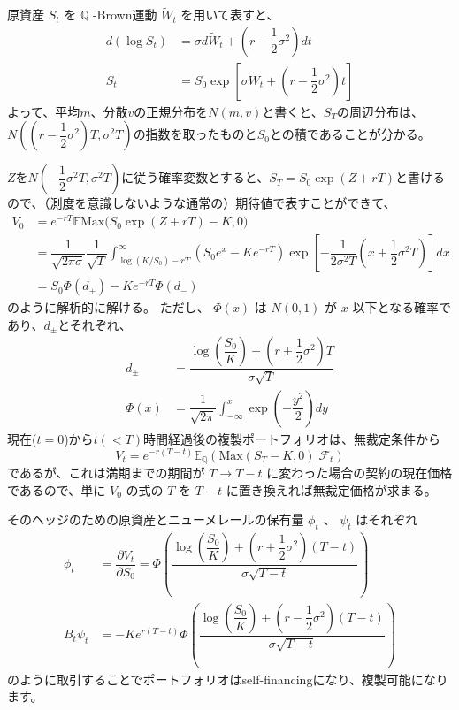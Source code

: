 \documentclass[uplatex,a4j,12pt,dvipdfmx]{jsarticle}
\begin{document}
原資産 $S_{t}$ を $\mathbb{Q}$ -Brown運動 $\tilde{W}_{t}$ を用いて表すと、
\begin{align*}
	d(\log S_{t}) & = \sigma d \tilde{W}_{t} + \left( r - \dfrac{1}{2} \sigma^{2} \right) dt                        \\
	S_{t}         & = S_{0} \exp \left[ \sigma \tilde{W}_{t} + \left( r - \dfrac{1}{2} \sigma^{2} \right) t \right]
\end{align*}
よって、平均$m$、分散$v$の正規分布を$N(m,v)$と書くと、$S_{T}$の周辺分布は、$N \left( \left( r - \dfrac{1}{2} \sigma^{2} \right) T , \sigma^{2} T \right)$の指数を取ったものと$S_{0}$との積であることが分かる。

$Z$を$N \left( - \dfrac{1}{2} \sigma^{2} T , \sigma^{2} T \right)$に従う確率変数とすると、$S_{T} = S_{0} \exp ( Z + rT )$と書けるので、（測度を意識しないような通常の）期待値で表すことができて、
\begin{align*}
	V_{0} & = e^{-rT} \mathbb{E} \mathrm{Max} \Big( S_{0} \exp ( Z + rT ) - K , 0 \Big)                                                                                                                                                    \\
	      & = \dfrac{1}{\sqrt{2 \pi \sigma}} \dfrac{1}{\sqrt{T}} \int^{\infty}_{\log(K/S_{0}) - rT} \left( S_{0} e^{x} - K e^{-rT} \right) \exp \left[ - \dfrac{1}{2 \sigma^{2} T} \left( x + \dfrac{1}{2} \sigma^{2} T \right) \right] dx \\
	      & = S_{0} \Phi(d_{+}) - K e^{-rT} \Phi(d_{-})
\end{align*}
のように解析的に解ける。
ただし、 $\Phi(x)$ は $N(0,1)$ が $x$ 以下となる確率であり、$d_{\pm}$とそれぞれ、
\begin{align*}
	d_{\pm} & = \dfrac{ \log \left( \dfrac{S_{0}}{K} \right) + \left( r \pm \dfrac{1}{2} \sigma^{2} \right) T }{ \sigma \sqrt{T} } \\
	\Phi(x) & = \dfrac{1}{\sqrt{2\pi}} \int^{x}_{- \infty} \exp \left( -\dfrac{y^{2}}{2} \right) dy
\end{align*}
現在($t=0$)から$t(<T)$時間経過後の複製ポートフォリオは、無裁定条件から
$$V_{t} = e^{-r(T-t)} \mathbb{E}_{\mathbb{Q}} \left( \mathrm{Max}(S_{T} - K,0) \Big| \mathcal{F}_{t} \right)$$
であるが、これは満期までの期間が $T \to T-t$ に変わった場合の契約の現在価格であるので、単に $V_{0}$ の式の $T$ を $T-t$ に置き換えれば無裁定価格が求まる。

そのヘッジのための原資産とニューメレールの保有量 $\phi_{t}$ 、 $\psi_{t}$ はそれぞれ
\begin{align*}
	\phi_{t}       & = \dfrac{\partial V_{t}}{\partial S_{0}} = \Phi \left( \dfrac{ \log \left( \dfrac{S_{0}}{K} \right) + \left( r + \dfrac{1}{2} \sigma^{2} \right) (T-t) }{ \sigma \sqrt{T-t} } \right) \\
	B_{t} \psi_{t} & = - K e^{r(T-t)} \Phi \left( \dfrac{ \log \left( \dfrac{S_{0}}{K} \right) + \left( r - \dfrac{1}{2} \sigma^{2} \right) (T-t) }{ \sigma \sqrt{T-t} } \right)
\end{align*}
のように取引することでポートフォリオはself-financingになり、複製可能になります。
\end{document}
